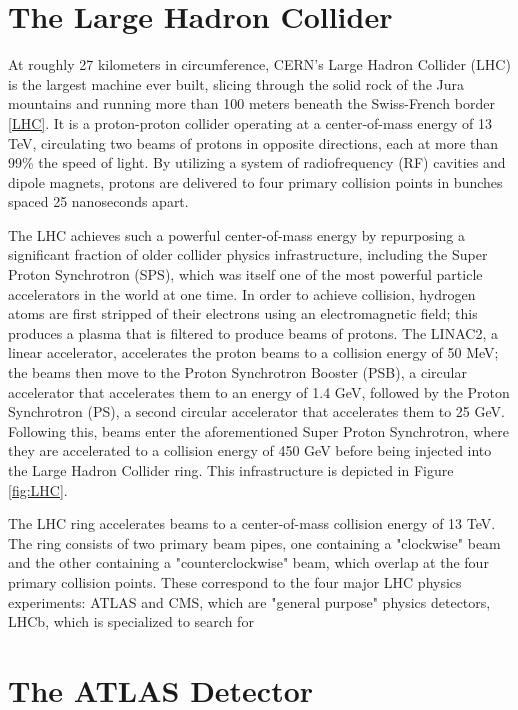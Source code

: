 \section{The Large Hadron Collider} \label{sec:LHC} 

At roughly 27 kilometers in circumference, CERN's Large Hadron Collider (LHC) is the largest machine ever built, slicing through the solid rock of the Jura mountains and running more than 100 meters beneath the Swiss-French border \ref{LHC}. It is a proton-proton collider operating at a center-of-mass energy of 13 TeV, circulating two beams of protons in opposite directions, each at more than 99\% the speed of light. By utilizing a system of radiofrequency (RF) cavities and dipole magnets, protons are delivered to four primary collision points in bunches spaced 25 nanoseconds apart.

The LHC achieves such a powerful center-of-mass energy by repurposing a significant fraction of older collider physics infrastructure, including the Super Proton Synchrotron (SPS), which was itself one of the most powerful particle accelerators in the world at one time. In order to achieve collision, hydrogen atoms are first stripped of their electrons using an electromagnetic field; this produces a plasma that is filtered to produce beams of protons. The LINAC2, a linear accelerator, accelerates the proton beams to a collision energy of 50 MeV; the beams then move to the Proton Synchrotron Booster (PSB), a circular accelerator that accelerates them to an energy of 1.4 GeV, followed by the Proton Synchrotron (PS), a second circular accelerator that accelerates them to 25 GeV. Following this, beams enter the aforementioned Super Proton Synchrotron, where they are accelerated to a collision energy of 450 GeV before being injected into the Large Hadron Collider ring. This infrastructure is depicted in Figure \ref{fig:LHC}.

The LHC ring accelerates beams to a center-of-mass collision energy of 13 TeV. The ring consists of two primary beam pipes, one containing a "clockwise" beam and the other containing a "counterclockwise" beam, which overlap at the four primary collision points. These correspond to the four major LHC physics experiments: ATLAS and CMS, which are "general purpose" physics detectors, LHCb, which is specialized to search for 






\section{The ATLAS Detector} \label{sec:ATLAS} 

